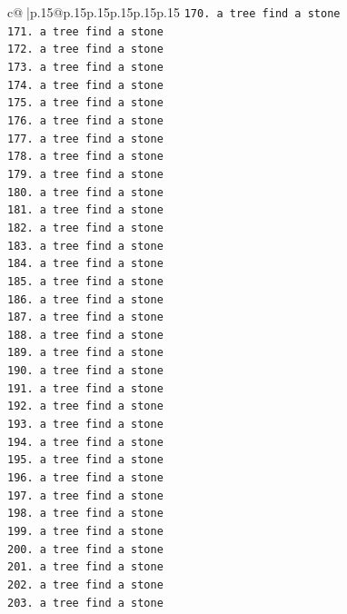 \documentclass{article}
\begin{document}
{\begin{supertabular}{c@{$\;$}|p{.15\linewidth}@{}p{.15\linewidth}p{.15\linewidth}p{.15\linewidth}p{.15\linewidth}p{.15\linewidth}}
{{{\texttt{170. a tree find a stone} \\
\texttt{171. a tree find a stone} \\
\texttt{172. a tree find a stone} \\
\texttt{173. a tree find a stone} \\
\texttt{174. a tree find a stone} \\
\texttt{175. a tree find a stone} \\
\texttt{176. a tree find a stone} \\
\texttt{177. a tree find a stone} \\
\texttt{178. a tree find a stone} \\
\texttt{179. a tree find a stone} \\
\texttt{180. a tree find a stone} \\
\texttt{181. a tree find a stone} \\
\texttt{182. a tree find a stone} \\
\texttt{183. a tree find a stone} \\
\texttt{184. a tree find a stone} \\
\texttt{185. a tree find a stone} \\
\texttt{186. a tree find a stone} \\
\texttt{187. a tree find a stone} \\
\texttt{188. a tree find a stone} \\
\texttt{189. a tree find a stone} \\
\texttt{190. a tree find a stone} \\
\texttt{191. a tree find a stone} \\
\texttt{192. a tree find a stone} \\
\texttt{193. a tree find a stone} \\
\texttt{194. a tree find a stone} \\
\texttt{195. a tree find a stone} \\
\texttt{196. a tree find a stone} \\
\texttt{197. a tree find a stone} \\
\texttt{198. a tree find a stone} \\
\texttt{199. a tree find a stone} \\
\texttt{200. a tree find a stone} \\
\texttt{201. a tree find a stone} \\
\texttt{202. a tree find a stone} \\
\texttt{203. a tree find a stone} \\
}}}
\end{supertabular}}
\end{document}
